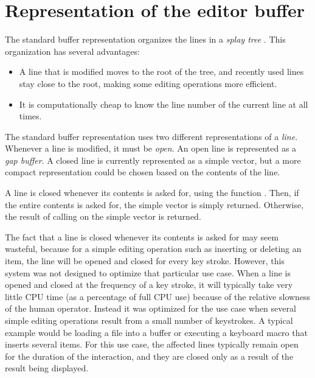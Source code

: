 \chapter{Representation of the editor buffer}
\label{chap-internals-buffer}

The standard buffer representation organizes the lines in a
\emph{splay tree} \cite{Sleator:1985:SBS:3828.3835}.  This
organization has several advantages:

\begin{itemize}
\item A line that is modified moves to the root of the tree, and
  recently used lines stay close to the root, making some editing
  operations more efficient.
\item It is computationally cheap to know the line number of the
  current line at all times. 
\end{itemize}

The standard buffer representation uses two different representations
of a \emph{line}.  Whenever a line is modified, it must be
\emph{open}.  An open line is represented as a \emph{gap buffer}.  A
closed line is currently represented as a simple vector, but a more
compact representation could be chosen based on the contents of the
line.

A line is closed whenever its contents is asked for, using the
function .  Then, if the entire contents is asked for, the
simple vector is simply returned.  Otherwise, the result of calling
 on the simple vector is returned. 

The fact that a line is closed whenever its contents is asked for may
seem wasteful, because for a simple editing operation such as
inserting or deleting an item, the line will be opened and closed for
every key stroke.  However, this system was not designed to optimize
that particular use case.  When a line is opened and closed at the
frequency of a key stroke, it will typically take very little CPU time
(as a percentage of full CPU use) because of the relative slowness of
the human operator.  Instead it was optimized for the use case when
several simple editing operations result from a small number of
keystrokes.  A typical example would be loading a file into a buffer
or executing a keyboard macro that inserts several items.  For this
use case, the affected lines typically remain open for the duration of
the interaction, and they are closed only as a result of the result
being displayed. 

